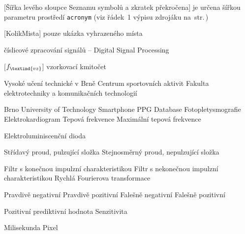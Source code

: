 \cleardoublepage
\chapter*{\listofabbrevname}
{}

\begin{acronym}[KolikMista]	%

		[Šířka levého sloupce Seznamu symbolů a zkratek překročena]
		{je určena šířkou parametru prostředí \texttt{acronym} (viz řádek~1 výpisu zdrojáku na~str.\,\pageref{lst:zkratky})}

		[KolikMista]
		{pouze ukázka vyhrazeného místa}

		{číslicové zpracování signálů -- Digital Signal Processing}

		[\ensuremath{f_\textind{vz}}]
		{vzorkovací kmitočet}

			{Vysoké učení technické v Brně}
			{Centrum sportovních aktivit}
			{Fakulta elektrotechniky a komunikačních technologií}

		{Brno University of Technology Smartphone PPG Database}
			{Fotopletysmografie}
			{Elektrokardiogram}
			{Tepová frekvence}
			{Maximální tepová frekvence}

			{Elektroluminiscenční dioda}

			{Střídavý proud, pulzující složka}
			{Stejnosměrný proud, nepulzující složka}
	
			{Filtr s konečnou impulzní charakteristikou}
			{Filtr s nekonečnou impulzní charakteristikou}
			{Rychlá Fourierova transformace}

			{Pravdivě negativní}	%
			{Pravdivě pozitivní}
			{Falešně negativní}
			{Falešně pozitivní}

			{Pozitivní prediktivní hodnota}
			{Senzitivita}

			{Milisekunda}	%
			{Pixel}			%


\end{acronym}
